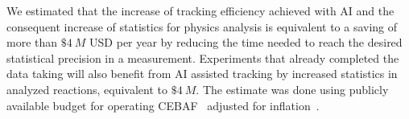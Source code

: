 We estimated that the increase of tracking efficiency achieved with AI and the consequent increase of statistics for physics analysis is equivalent to a saving of more than $\$4~M$ USD per year by reducing the time needed to reach the desired statistical precision in a measurement. Experiments that already completed the data taking will also benefit from AI assisted tracking by increased statistics in analyzed reactions, equivalent to $\$4~M$. The estimate was done using publicly available budget for operating CEBAF~\cite{CEBAF:oper} adjusted for inflation~\cite{GoogleDotCom}. 




